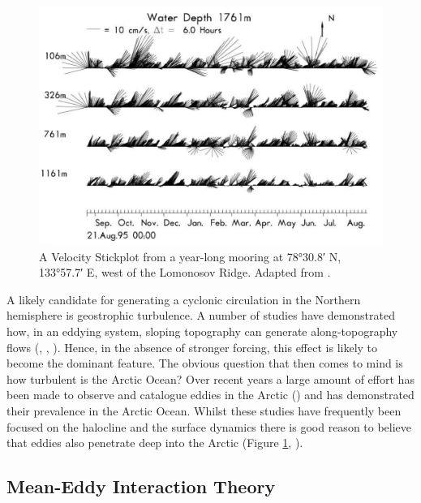 \documentclass[10pt,a4paper]{article}
\begin{document}
\begin{figure}
	\centering
	\includegraphics[width=\linewidth]{Woodgate2001Mooring}
	\caption[Adapted from \cite{woodgate2001arctic}]{A Velocity Stickplot 
		from a year-long mooring at \ang{78;30.8;} N, \ang{133;57.7;} E, west of the Lomonosov Ridge.  Adapted from \cite{woodgate2001arctic}.}
	\label{fig:Woodgate2001Mooring}
\end{figure}

A likely candidate for generating a cyclonic circulation in the Northern hemisphere is
geostrophic turbulence. A number of studies have demonstrated how, in an eddying system, 
sloping topography can generate along-topography flows (\cite{treguier1989topographically}, \cite{adcock2000interactions}, \cite{nost2008asymmetry}). Hence, in the absence of stronger
forcing, this effect is likely to become the dominant feature. The obvious question that then
comes to mind is how turbulent is the Arctic Ocean? Over recent years a large amount  of 
effort has been made to observe and catalogue eddies in the Arctic
(\cite{zhao2014characterizing}) and has demonstrated their prevalence in the Arctic Ocean.
Whilst these studies have frequently been focused on the halocline and the surface dynamics
there is good reason to believe that eddies also penetrate deep into the Arctic 
(Figure \ref{fig:Woodgate2001Mooring}, \cite{woodgate2001arctic}).

\subsection{Mean-Eddy Interaction Theory}
\end{document}
